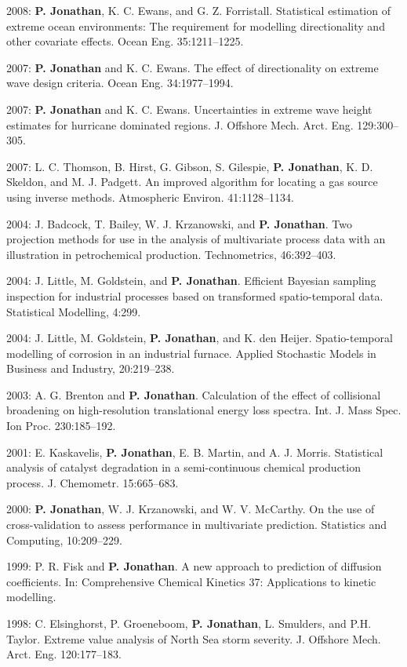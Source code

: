 \documentclass[11pt,a4paper]{moderncv}
\begin{document}
2008: \textbf{P. Jonathan}, K. C. Ewans, and G. Z. Forristall. Statistical estimation of extreme ocean environments: The requirement for modelling directionality and other covariate effects. Ocean Eng. 35:1211--1225.

2007: \textbf{P. Jonathan} and K. C. Ewans. The effect of directionality on extreme wave design criteria. Ocean Eng. 34:1977--1994.

2007: \textbf{P. Jonathan} and K. C. Ewans. Uncertainties in extreme wave height estimates for hurricane dominated regions. J. Offshore Mech. Arct. Eng. 129:300--305.

2007: L. C. Thomson, B. Hirst, G. Gibson, S. Gilespie, \textbf{P. Jonathan}, K. D. Skeldon, and M. J. Padgett. An improved algorithm for locating a gas source using inverse methods. Atmospheric Environ. 41:1128--1134.

2004: J. Badcock, T. Bailey, W. J. Krzanowski, and \textbf{P. Jonathan}. Two projection methods for use in the analysis of multivariate process data with an illustration in petrochemical production. Technometrics, 46:392--403.

2004: J. Little, M. Goldstein, and \textbf{P. Jonathan}. Efficient Bayesian sampling inspection for industrial processes based on transformed spatio-temporal data. Statistical Modelling, 4:299.

2004: J. Little, M. Goldstein, \textbf{P. Jonathan}, and K. den Heijer. Spatio-temporal modelling of corrosion in an industrial furnace. Applied Stochastic Models in Business and Industry, 20:219--238.

2003: A. G. Brenton and \textbf{P. Jonathan}. Calculation of the effect of collisional broadening on high-resolution translational energy loss spectra. Int. J. Mass Spec. Ion Proc. 230:185--192.

2001: E. Kaskavelis, \textbf{P. Jonathan}, E. B. Martin, and A. J. Morris. Statistical analysis of catalyst degradation in a semi-continuous chemical production process. J. Chemometr. 15:665--683.

2000: \textbf{P. Jonathan}, W. J. Krzanowski, and W. V. McCarthy. On the use of cross-validation to assess performance in multivariate prediction. Statistics and Computing, 10:209--229.

1999: P. R. Fisk and \textbf{P. Jonathan}. A new approach to prediction of diffusion coefficients. In: Comprehensive Chemical Kinetics 37: Applications to kinetic modelling. 

1998: C. Elsinghorst, P. Groeneboom, \textbf{P. Jonathan}, L. Smulders, and P.H. Taylor. Extreme value analysis of North Sea storm severity. J. Offshore Mech. Arct. Eng. 120:177--183.
\end{document}

